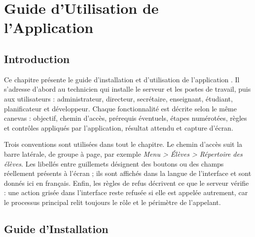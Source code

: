 \chapter{Guide d'Utilisation de l'Application}

\section{Introduction}
Ce chapitre présente le guide d'installation et d'utilisation de l'application \textbf{\appname}. Il
s'adresse d'abord au technicien qui installe le serveur et les postes de travail, puis aux utilisateurs :
administrateur, directeur, secrétaire, enseignant, étudiant, planificateur et développeur. Chaque
fonctionnalité est décrite selon le même canevas : objectif, chemin d'accès, prérequis éventuels, étapes
numérotées, règles et contrôles appliqués par l'application, résultat attendu et capture d'écran.

Trois conventions sont utilisées dans tout le chapitre. Le chemin d'accès suit la barre latérale, de
groupe à page, par exemple \emph{Menu > Élèves > Répertoire des élèves}. Les libellés entre guillemets
désignent des boutons ou des champs réellement présents à l'écran ; ils sont affichés dans la langue de
l'interface et sont donnés ici en français. Enfin, les règles de refus décrivent ce que le serveur
vérifie : une action grisée dans l'interface reste refusée si elle est appelée autrement, car le
processus principal relit toujours le rôle et le périmètre de l'appelant.

\section{Guide d'Installation}

